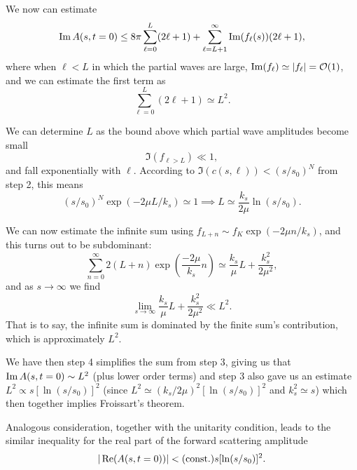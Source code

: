 We now can estimate
\begin{equation}
\operatorname{Im}A(s,t=0)\leq8\pi\sum^{L}_{\ell=0}(2\ell+1) + \sum^{\infty}_{\ell=L+1}\operatorname{Im}(f_{\ell}(s))(2\ell+1),
\end{equation}
where when $\ell<L$ in which the partial waves are large,
$\operatorname{Im}(f_{\ell})\simeq|f_{\ell}|=\mathcal{O}(1)$, and we can estimate the first
term as
\begin{equation}
\sum^{L}_{\ell=0}(2\ell+1)\simeq L^{2}.
\end{equation}

We can determine $L$ as the bound above which partial wave amplitudes
become small
\begin{equation}
\Im(f_{\ell>L})\ll 1,
\end{equation}
and fall exponentially with $\ell$. According to
$\Im(c(s,\ell))<(s/s_{0})^{N}$ from step 2, this means
\begin{equation}
(s/s_{0})^{N}\exp(-2\mu L/k_{s})\simeq1\implies \boxed{L\simeq\frac{k_{s}}{2\mu}\ln(s/s_{0}).}
\end{equation}

We can now estimate the infinite sum using $f_{L+n}\sim f_{K}\exp(-2\mu n/k_{s})$,
and this turns out to be subdominant:
\begin{equation}
\sum^{\infty}_{n=0}2(L+n)\exp\left(\frac{-2\mu}{k_{s}}n\right)\simeq\frac{k_{s}}{\mu}L
+\frac{k_{s}^{2}}{2\mu^{2}},
\end{equation}
and as $s\to\infty$ we find
\begin{equation}
\lim_{s\to\infty}\frac{k_{s}}{\mu}L
+\frac{k_{s}^{2}}{2\mu^{2}}\ll L^{2}.
\end{equation}
That is to say, the infinite sum is dominated by the finite sum's
contribution, which is approximately $L^{2}$.

We have then step 4 simplifies the sum from step 3, giving us that
$\operatorname{Im}A(s,t=0)\sim L^{2}$ (plus lower order terms)
and step 3 also gave us an estimate $L^{2}\propto s[\ln(s/s_{0})]^{2}$
(since $L^{2}\simeq (k_{s}/2\mu)^{2}[\ln(s/s_{0})]^{2}$ and
$k_{s}^{2}\simeq s$)
which then together implies Froissart's theorem.\qquad\qedsymbol


\begin{corollary}
Analogous consideration, together with the unitarity condition, leads to
the similar inequality for the real part of the forward scattering
amplitude
\begin{equation}
|\operatorname{Re}(A(s,t=0))|<\mbox{\normalfont(const.)}s[\ln(s/s_{0})]^{2}.
\end{equation}
\end{corollary}

